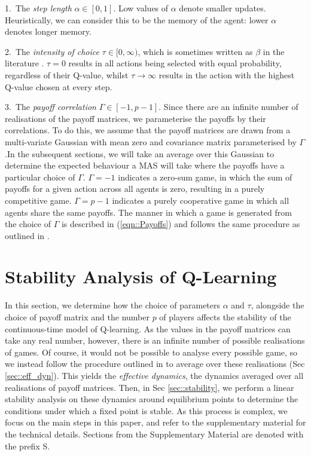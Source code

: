\documentclass{article}
\begin{document}
1.~The \textit{step length} $\alpha \in [0, 1]$. Low values of $\alpha$ denote smaller
    updates. Heuristically, we can consider this to be the memory of the agent: lower $\alpha$
    denotes longer memory.
    
2.~The \textit{intensity of choice} $\tau \in [0, \infty)$,
which is sometimes
      written as $\beta$ in the literature \cite{piliouras:catastrophe}.  $\tau =
      0$ results in all actions being selected with equal probability,
      regardless of their Q-value, whilst $\tau \rightarrow \infty$
      results in the action with the highest Q-value chosen at every
      step. 
    
3.~The \textit{payoff
      correlation} $\Gamma \in [-1, p-1]$. Since there are an infinite number of realisations
      of the payoff matrices, we parameterise the payoffs by their correlations. To do this, we assume
      that the payoff matrices are drawn from a multi-variate Gaussian
      with mean zero and covariance matrix parameterised by
      $\Gamma$.In the subsequent sections, we will take an average over this Gaussian to determine the expected behaviour a MAS will take where the payoffs have a particular choice of $\Gamma$. $\Gamma = -1$
      indicates a zero-sum game, in which the sum of payoffs for a
      given action across all agents is zero, resulting in a purely
      competitive game. $\Gamma = p-1$ indicates a purely cooperative game
      in which all agents share the same payoffs. The manner in which
      a game is generated from the choice of $\Gamma$ is described in
      (\ref{eqn::Payoffs}) and follows the same procedure as
      outlined in \cite{sanders:prevalence}.


\section{Stability Analysis of Q-Learning} \label{sec::Theory}

In this section, we determine how the choice of parameters
$\alpha$ and $\tau$, alongside the choice of payoff matrix and the number $p$ of players affects the
stability of the continuous-time model of Q-learning. As the values in the
payoff matrices can take any real number, however, there is an infinite number
of possible realisations of games. Of course, it would not be possible
to analyse every possible game, so we instead follow the procedure
outlined in \cite{coolen:minority,galla:complex} to average over
these realisations (Sec \ref{sec::eff_dyn}). This yields the \textit{effective
dynamics}, the dynamics averaged over all realisations of payoff
matrices. Then, in Sec \ref{sec::stability}, we perform a linear stability analysis on these dynamics around
equilibrium points to determine the conditions under which a fixed
point is stable. As this process is complex, we focus on the main steps in this paper, and refer to the supplementary material for the technical details. Sections from the Supplementary Material are denoted with the prefix S.
\end{document}
